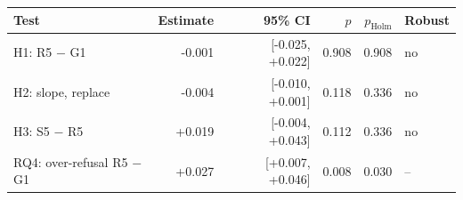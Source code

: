 \begin{tabular}{lrrrrl}
\toprule
Test & Estimate & 95\% CI & $p$ & $p_{\mathrm{Holm}}$ & Robust \\
\midrule
H1: R5 $-$ G1 & -0.001 & [-0.025, +0.022] & 0.908 & 0.908 & no \\
H2: slope, replace & -0.004 & [-0.010, +0.001] & 0.118 & 0.336 & no \\
H3: S5 $-$ R5 & +0.019 & [-0.004, +0.043] & 0.112 & 0.336 & no \\
RQ4: over-refusal R5 $-$ G1 & +0.027 & [+0.007, +0.046] & 0.008 & 0.030 & -- \\
\bottomrule
\end{tabular}
